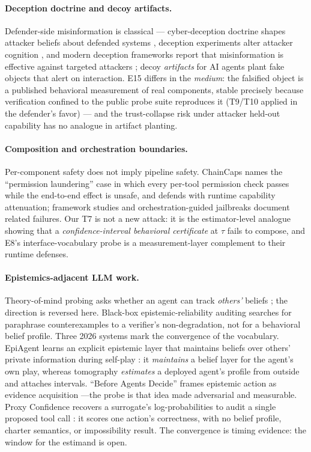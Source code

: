 \documentclass[acmsmall,review,anonymous]{acmart}
\begin{document}
\paragraph{Deception doctrine and decoy artifacts.}
Defender-side misinformation is classical --- cyber-deception doctrine shapes
attacker beliefs about defended systems \cite{bodeau2013}, deception
experiments alter attacker cognition \cite{fergusonwalter2017}, and modern
deception frameworks report that misinformation is effective against targeted
attackers \cite{perry2025}; decoy \emph{artifacts} for AI agents
\cite{honeypotagents2026} plant fake objects that alert on interaction. E15
differs in the \emph{medium}: the falsified object is a published behavioral
measurement of real components, stable precisely because verification confined
to the public probe suite reproduces it (T9/T10 applied in the defender's
favor) --- and the trust-collapse risk under attacker held-out capability has
no analogue in artifact planting.

\paragraph{Composition and orchestration boundaries.}
Per-component safety does not imply pipeline safety. ChainCaps \cite{chaincaps2026}
names the ``permission laundering'' case in which every per-tool permission
check passes while the end-to-end effect is unsafe, and defends with runtime
capability attenuation; framework studies \cite{orchestration2026} and
orchestration-guided jailbreaks \cite{orchjail2026} document related failures.
Our T7 is not a new attack: it is the estimator-level analogue showing that a
\emph{confidence-interval behavioral certificate} at $\tau$ fails to compose,
and E8's interface-vocabulary probe is a measurement-layer complement to their
runtime defenses.

\paragraph{Epistemics-adjacent LLM work.}
Theory-of-mind probing asks whether an agent can track \emph{others'} beliefs
\cite{strachan2024}; the direction is reversed here. Black-box epistemic-reliability
auditing \cite{eraudit} searches for paraphrase counterexamples to a verifier's
non-degradation, not for a behavioral belief profile. Three 2026 systems mark the
convergence of the vocabulary. EpiAgent learns an explicit epistemic layer that
maintains beliefs over others' private information during self-play
\cite{epiagent}: it \emph{maintains} a belief layer for the agent's own play,
whereas tomography \emph{estimates} a deployed agent's profile from outside and
attaches intervals. ``Before Agents Decide'' frames epistemic action as evidence
acquisition \cite{beforedecide}---the probe is that idea made adversarial and
measurable. Proxy Confidence recovers a surrogate's log-probabilities to audit a
single proposed tool call \cite{proxyconfidence}: it scores one action's
correctness, with no belief profile, charter semantics, or impossibility result.
The convergence is timing evidence: the window for the estimand is open.
\end{document}
